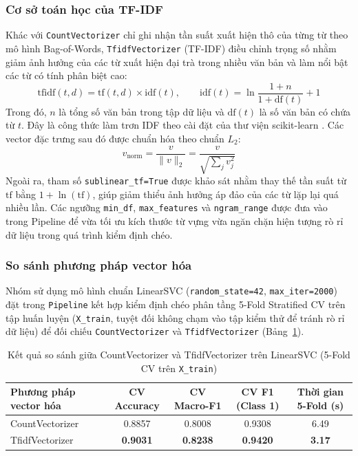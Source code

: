 \subsubsection{Cơ sở toán học của TF-IDF}
Khác với \texttt{CountVectorizer} chỉ ghi nhận tần suất xuất hiện thô của từng từ theo mô hình Bag-of-Words, \texttt{TfidfVectorizer} (TF-IDF) điều chỉnh trọng số nhằm giảm ảnh hưởng của các từ xuất hiện đại trà trong nhiều văn bản và làm nổi bật các từ có tính phân biệt cao:
\begin{equation}
\text{tfidf}(t, d) = \text{tf}(t, d) \times \text{idf}(t), \qquad \text{idf}(t) = \ln\frac{1 + n}{1 + \text{df}(t)} + 1
\end{equation}
Trong đó, $n$ là tổng số văn bản trong tập dữ liệu và $\text{df}(t)$ là số văn bản có chứa từ $t$. Đây là công thức làm trơn IDF theo cài đặt của thư viện scikit-learn \cite{pedregosa2011}. Các vector đặc trưng sau đó được chuẩn hóa theo chuẩn $L_2$:
\begin{equation}
v_{\text{norm}} = \frac{v}{\|v\|_2} = \frac{v}{\sqrt{\sum_j v_j^2}}
\end{equation}
Ngoài ra, tham số \texttt{sublinear\_tf=True} được khảo sát nhằm thay thế tần suất từ $\text{tf}$ bằng $1 + \ln(\text{tf})$, giúp giảm thiểu ảnh hưởng áp đảo của các từ lặp lại quá nhiều lần. Các ngưỡng \texttt{min\_df}, \texttt{max\_features} và \texttt{ngram\_range} được đưa vào trong Pipeline để vừa tối ưu kích thước từ vựng vừa ngăn chặn hiện tượng rò rỉ dữ liệu trong quá trình kiểm định chéo.

\subsubsection{So sánh phương pháp vector hóa}
Nhóm sử dụng mô hình chuẩn LinearSVC (\texttt{random\_state=42}, \texttt{max\_iter=2000}) đặt trong \texttt{Pipeline} kết hợp kiểm định chéo phân tầng 5-Fold Stratified CV trên tập huấn luyện (\texttt{X\_train}, tuyệt đối không chạm vào tập kiểm thử để tránh rò rỉ dữ liệu) để đối chiếu \texttt{CountVectorizer} và \texttt{TfidfVectorizer} (Bảng~\ref{tab:tokenizers_eval}).

\begin{table}[H]
\centering
\begin{tabular}{|l|c|c|c|c|}
\hline
\textbf{Phương pháp vector hóa} & \textbf{CV Accuracy} & \textbf{CV Macro-F1} & \textbf{CV F1 (Class 1)} & \textbf{Thời gian 5-Fold (s)} \\ \hline
CountVectorizer & 0.8857 & 0.8008 & 0.9308 & 6.49 \\ \hline
TfidfVectorizer & \textbf{0.9031} & \textbf{0.8238} & \textbf{0.9420} & \textbf{3.17} \\ \hline
\end{tabular}
\caption{Kết quả so sánh giữa CountVectorizer và TfidfVectorizer trên LinearSVC (5-Fold CV trên \texttt{X\_train})}
\label{tab:tokenizers_eval}
\end{table}

